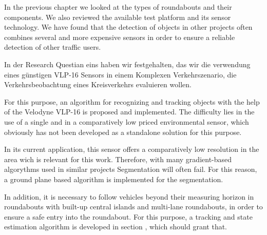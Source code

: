 \documentclass[11pt,oneside,openright]{mpreport}
\begin{document}
In the previous chapter we looked at the types of roundabouts and their components. We also reviewed the available test platform and its sensor technology.
We have found that the detection of objects in other projects often combines several and more expensive sensors in order to ensure a reliable detection of other traffic users.

In der Research Questian eins haben wir festgehalten, das wir die verwendung eines günstigen VLP-16 Sensors in einem 
Komplexen Verkehrszenario, die Verkehrsbeobachtung eines Kreisverkehrs evaluieren wollen.


For this purpose, an algorithm for recognizing and tracking objects with the help of the Velodyne VLP-16 is proposed and implemented. 
The difficulty lies in the use of a single and in a comparatively low priced environmental sensor, which obviously has not been developed as a standalone solution for this purpose.


In its current application, this sensor offers a comparatively low resolution in the area wich is relevant for this work.
Therefore, with many gradient-based algorythms used in similar projects Segmentation will often fail.
 For this reason, a ground plane based algorithm is implemented for the segmentation.


In addition, it is necessary to follow vehicles beyond their measuring horizon in roundabouts with built-up central islands and multi-lane roundabouts, 
in order to ensure a safe entry into the roundabout.
For this purpose, a tracking and state estimation algorithm is developed in section , which should grant that.
\end{document}
